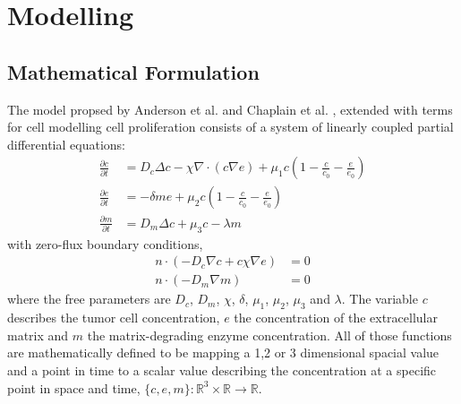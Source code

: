 \section{Modelling}

\subsection{Mathematical Formulation}

The model propsed by Anderson et al. \cite{anderson_continuous_1998,anderson_mathematical_2000} 
and Chaplain et al. \cite{anderson_continuous_1998,chaplain_mathematical_2006,chaplain_mathematical_2006-1,franssen_mathematical_2019}, extended with terms for cell modelling cell proliferation consists of a system of linearly coupled partial differential equations: 
\begin{align*}
	\frac{\partial c}{\partial t} &= D_c \Delta c - \chi \nabla \cdot (c\nabla e)  + \mu_1 c\left(1-\frac{c}{c_0}-\frac{e}{e_0}\right)
    \\
	\frac{\partial e}{\partial t} &= -\delta m e  + \mu_2 c\left(1-\frac{c}{c_0}-\frac{e}{e_0}\right)\\
	\frac{\partial m}{\partial t} &= D_m \Delta c + \mu_3 c - \lambda m
\end{align*}
with zero-flux boundary conditions, 
\begin{align*}
	n\cdot (-D_c \nabla c + c \chi\nabla e) &= 0 \\
	n \cdot (-D_m\nabla m ) &= 0
\end{align*}
where the free parameters are $D_c$, $D_m$, $\chi$, $\delta$, $\mu_1$, $\mu_2$, $\mu_3$ and $\lambda$. \newline
The variable $c$ describes the tumor cell concentration, $e$ the concentration of the extracellular matrix and $m$ the matrix-degrading enzyme concentration. All of those functions are mathematically defined to be mapping a 1,2 or 3 dimensional spacial value and a point in time to a scalar value describing the concentration at a specific point in space and time, $\{c,e,m\} : \mathbb{R}^{3} \times \mathbb{R} \rightarrow \mathbb{R}$.\newline
